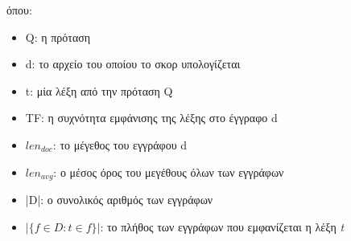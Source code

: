 όπου:
\begin{itemize}
    \item Q: η πρόταση
    \item d: το αρχείο του οποίου το σκορ υπολογίζεται
    \item t: μία λέξη από την πρόταση Q
    \item TF: η συχνότητα εμφάνισης της λέξης στο έγγραφο d
    \item $len_{doc}$: το μέγεθος του εγγράφου d
    \item $len_{avg}$: ο μέσος όρος του μεγέθους όλων των εγγράφων
    \item |D|: ο συνολικός αριθμός των εγγράφων
    \item $| \{ f \in D : t \in f \} |$: το πλήθος των εγγράφων που εμφανίζεται η λέξη \emph{t}
\end{itemize}